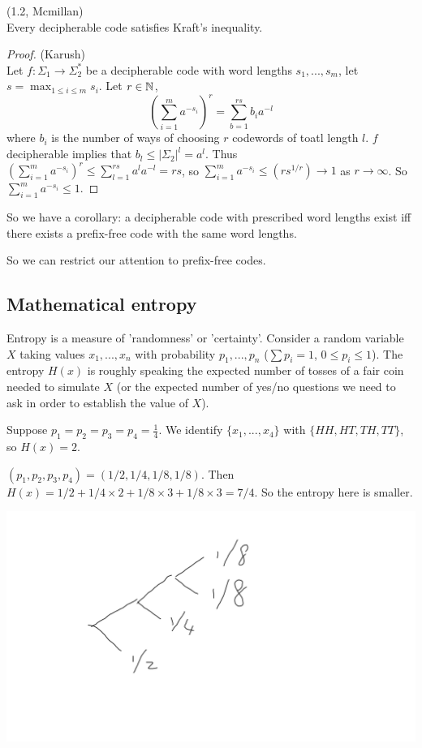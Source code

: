 \documentclass[a4paper]{article}
\begin{document}
\begin{thm} (1.2, Mcmillan)\\
Every decipherable code satisfies Kraft's inequality.
\begin{proof} (Karush)\\
Let $f:\Sigma_1 \to \Sigma_2^*$ be a decipherable code with word lengths $s_1,...,s_m$, let $s = \max_{1 \leq i \leq m} s_i$. Let $r \in \mathbb{N}$, $$(\sum_{i=1}^m a^{-s_i})^r = \sum_{b = 1}^{rs} b_i a^{-l}$$ where $b_i$ is the number of ways of choosing $r$ codewords of toatl length $l$. $f$ decipherable implies that $b_l \leq |\Sigma_2|^l = a^l$. Thus $(\sum_{i=1}^m a^{-s_i})^r \leq \sum_{l=1}^{rs} a^l a^{-l} = rs$, so $\sum_{i=1}^m a^{-s_i} \leq (rs^{1/r}) \to 1$ as $r \to \infty$. So $\sum_{i=1}^m a^{-s_i} \leq 1$.
\end{proof}
\end{thm}

So we have a corollary: a decipherable code with prescribed word lengths exist iff there exists a prefix-free code with the same word lengths.

So we can restrict our attention to prefix-free codes.

\subsection{Mathematical entropy}
Entropy is a measure of 'randomness' or 'certainty'. Consider a random variable $X$ taking values $x_1,...,x_n$ with probability $p_1,...,p_n$ ($\sum p_i = 1$, $0 \leq p_i \leq 1$). The entropy $H(x)$ is roughly speaking the expected number of tosses of a fair coin needed to simulate $X$ (or the expected number of yes/no questions we need to ask in order to establish the value of $X$).

\begin{eg}
Suppose $p_1 = p_2 = p_3 = p_4 = \frac{1}{4}$. We identify $\{x_1,...,x_4\}$ with $\{HH,HT,TH,TT\}$, so $H(x) = 2$.
\end{eg}

\begin{eg}
$(p_1,p_2,p_3,p_4) = (1/2,1/4,1/8,1/8)$. Then $H(x) = 1/2+1/4 \times 2 + 1/8 \times 3 + 1/8 \times 3=7/4$. So the entropy here is smaller.

\includegraphics[scale=0.5]{image/CC_02.png}
\end{eg}
\end{document}
